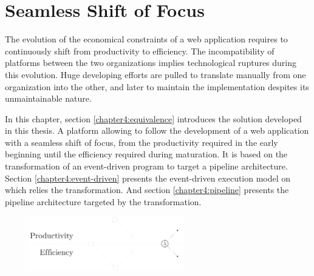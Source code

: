 \chapter{Seamless Shift of Focus} \label{chapter4}
\minitoc
\eject

The evolution of the economical constraints of a web application requires to continuously shift from productivity to efficiency.
The incompatibility of platforms between the two organizations implies technological ruptures during this evolution.
Huge developing efforts are pulled to translate manually from one organization into the other, and later to maintain the implementation despites its unmaintainable nature.

In this chapter, section \ref{chapter4:equivalence} introduces the solution developed in this thesis.
A platform allowing to follow the development of a web application with a seamless shift of focus, from the productivity required in the early beginning until the efficiency required during maturation.
It is based on the transformation of an event-driven program to target a pipeline architecture.
Section \ref{chapter4:event-driven} presents the event-driven execution model on which relies the transformation.
And section \ref{chapter4:pipeline} presents the pipeline architecture targeted by the transformation.

\begin{figure}[h!] \label{fig:state-of-the-art-proposition}
\begin{center}
\includegraphics[width=0.6\textwidth]{../resources/state-of-the-art-5.pdf}
\end{center}
\end{figure}



